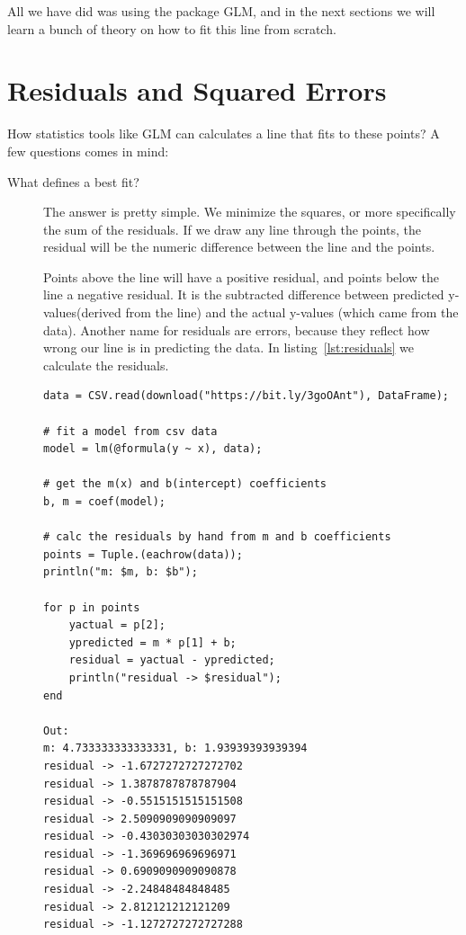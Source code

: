 \documentclass[a4paper, 11pt]{article}
\begin{document}
All we have did was using the package GLM, and in the next sections we will learn a bunch of theory on how to fit this line from scratch.

\section{Residuals and Squared Errors}
How statistics tools like GLM can calculates a line that fits to these points? A few questions comes in mind:

\begin{description}
	\item[What defines a best fit?] The answer is pretty simple. We minimize the squares, or more specifically the sum of the residuals. If we draw any line through the points, the residual will be the numeric difference between the line and the points.
	
	Points above the line will have a positive residual, and points below the line a negative residual. It is the subtracted difference between predicted y-values(derived from the line) and the actual y-values (which came from the data). Another name for residuals are errors, because they reflect how wrong our line is in predicting the data. In listing~\ref{lst:residuals} we calculate the residuals.

\begin{lstlisting}[caption={Calculating the residuals for a given line and data},label={lst:residuals}]
data = CSV.read(download("https://bit.ly/3goOAnt"), DataFrame);

# fit a model from csv data
model = lm(@formula(y ~ x), data);

# get the m(x) and b(intercept) coefficients
b, m = coef(model);

# calc the residuals by hand from m and b coefficients
points = Tuple.(eachrow(data));
println("m: $m, b: $b");

for p in points
    yactual = p[2];
    ypredicted = m * p[1] + b;
    residual = yactual - ypredicted;
    println("residual -> $residual");
end

Out:
m: 4.733333333333331, b: 1.93939393939394
residual -> -1.6727272727272702
residual -> 1.3878787878787904  
residual -> -0.5515151515151508 
residual -> 2.5090909090909097  
residual -> -0.43030303030302974
residual -> -1.369696969696971  
residual -> 0.6909090909090878  
residual -> -2.24848484848485   
residual -> 2.812121212121209   
residual -> -1.1272727272727288 
\end{lstlisting}


\end{description}
\end{document}
